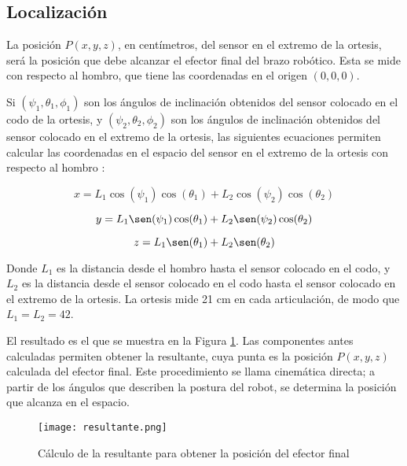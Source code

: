\subsection{Localización}

La posición $P(x, y, z)$, en centímetros, del sensor en el extremo de la ortesis, será la posición que debe alcanzar el efector final del brazo robótico. Esta se mide con respecto al hombro, que tiene las coordenadas en el origen $(0, 0 ,0)$.

Si $(\psi_{1}, \theta_{1}, \phi_{1})$ son los ángulos de inclinación obtenidos del sensor colocado en el codo de la ortesis, y $(\psi_{2}, \theta_{2}, \phi_{2})$ son los ángulos de inclinación obtenidos del sensor colocado en el extremo de la ortesis, las siguientes ecuaciones permiten calcular las coordenadas en el espacio del sensor en el extremo de la ortesis con respecto al hombro \cite{mathworks2025}:

\begin{equation}
x = L_1 \cos(\psi_1) \cos(\theta_1) + L_2 \cos(\psi_2) \cos(\theta_2)
\end{equation}

\begin{equation}
y = L_1 \sen(\psi_1) \cos(\theta_1) + L_2 \sen(\psi_2) \cos(\theta_2)
\end{equation}

\begin{equation}
z = L_1 \sen(\theta_1) + L_2 \sen(\theta_2)
\end{equation}

Donde $L_1$ es la distancia desde el hombro hasta el sensor colocado en el codo, y $L_2$ es la distancia desde el sensor colocado en el codo hasta el sensor colocado en el extremo de la ortesis. La ortesis mide 21 cm en cada articulación, de modo que $L_1 = L_2 = 42$.

El resultado es el que se muestra en la Figura \ref{fig:resultante}. Las componentes antes calculadas permiten obtener la resultante, cuya punta es la posición $P(x,y,z)$ calculada del efector final. Este procedimiento se llama cinemática directa; a partir de los ángulos que describen la postura del robot, se determina la posición que alcanza en el espacio.

\begin{figure}[htb]
	\centering
	\texttt{[image: resultante.png]}
	\caption{Cálculo de la resultante para obtener la posición del efector final}
	\label{fig:resultante}
\end{figure}